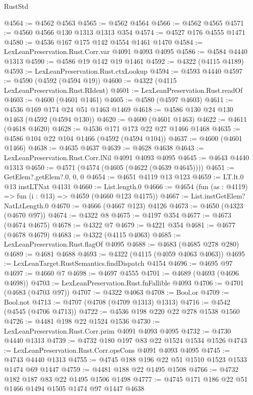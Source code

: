 \begin{lexlean}{RustStd}
\begin{coremodule}
@4564 := @4562 @4563
@4565 := @4562 @4564
@4566 := @4562 @4565
@4571 := @4560 @4566 @130 @1313 @1313 @354
@4574 := @4527 @176 @4555 @1471
@4580 := @4536 @167 @175 @142 @4554 @1461 @1470
@4584 := LexLeanPreservation.Rust.Corr.var @4091 @4093 @4095
@4586 := @4584 @4440 @1313
@4590 := @4586 @19 @142 @19 @1461
@4592 := @4322 (@4115 @4189)
@4593 := LexLeanPreservation.Rust.ctxLookup
@4594 := @4593 @4440
@4597 := @4590 (@4592 (@4594 @19))
@4600 := @4322 (@4115 LexLeanPreservation.Rust.RIdent)
@4601 := LexLeanPreservation.Rust.readOf
@4603 := @4600 (@4601 @1461)
@4605 := @4580 (@4597 @4603)
@4611 := @4536 @169 @174 @24 @51 @1463 @1469
@4618 := @4586 @130 @24 @130 @1463 (@4592 (@4594 @130))
@4620 := @4600 (@4601 @1463)
@4622 := @4611 (@4618 @4620)
@4628 := @4536 @171 @173 @22 @27 @1466 @1468
@4635 := @4586 @104 @22 @104 @1466 (@4592 (@4594 @104))
@4637 := @4600 (@4601 @1466)
@4638 := @4635 @4637
@4639 := @4628 @4638
@4643 := LexLeanPreservation.Rust.Corr.lNil @4091 @4093 @4095
@4645 := @4643 @4440 @1313
@4650 := @4571 (@4574 (@4605 (@4622 (@4639 @4645))))
@4651 := GetElem?.getElem?.{0, 0, 0}
@4654 := @4651 @4119 @13 @123
@4659 := LT.lt.{0} @13 instLTNat @4131
@4660 := List.length.{0}
@4666 := @4654 (fun (as : @4119) => fun (i : @13) => @4659 (@4660 @123 @4175))
@4667 := List.instGetElem?NatLtLength.{0}
@4670 := @4666 (@4667 @123) @4126
@4673 := @4650 (@4323 (@4670 @97))
@4674 := @4322 @8
@4675 := @4197 @354
@4677 := @4673 (@4674 @4675)
@4678 := @4322 @7
@4679 := @4221 @354
@4681 := @4677 (@4678 @4679)
@4683 := @4322 (@4115 @4063)
@4685 := LexLeanPreservation.Rust.flagOf @4095
@4688 := @4683 (@4685 @278 @280)
@4689 := @4681 @4688
@4693 := @4322 (@4115 (@4059 @4063 @4063))
@4695 := LexLeanTarget.RustSemantics.findDispatch @4154
@4696 := @4695 @97
@4697 := @4660 @7
@4698 := @4697 @4555
@4701 := @4689 (@4693 (@4696 @4698))
@4703 := LexLeanPreservation.Rust.fnFallible @4093
@4706 := @4701 (@4683 (@4703 @97))
@4707 := @4322 @4063
@4708 := Bool.or
@4709 := Bool.not
@4713 := @4707 (@4708 (@4709 @1313) @1313)
@4716 := @4542 (@4545 (@4706 @4713))
@4722 := @4536 @198 @220 @22 @278 @1538 @1560
@4726 := @4481 @198 @22 @1524 @1536
@4730 := LexLeanPreservation.Rust.Corr.prim @4091 @4093 @4095
@4732 := @4730 @4440 @1313
@4739 := @4732 @180 @197 @83 @22 @1524 @1534 @1526
@4743 := LexLeanPreservation.Rust.Corr.opsCons @4091 @4093 @4095
@4745 := @4743 @4440 @1313
@4755 := @4745 @188 @196 @22 @51 @1510 @1523 @1533 @1474 @69 @1447
@4759 := @4481 @188 @22 @1495 @1508
@4766 := @4732 @182 @187 @83 @22 @1495 @1506 @1498
@4777 := @4745 @171 @186 @22 @51 @1466 @1494 @1505 @1474 @97 @1447 @4638

\end{coremodule}
\end{lexlean}
